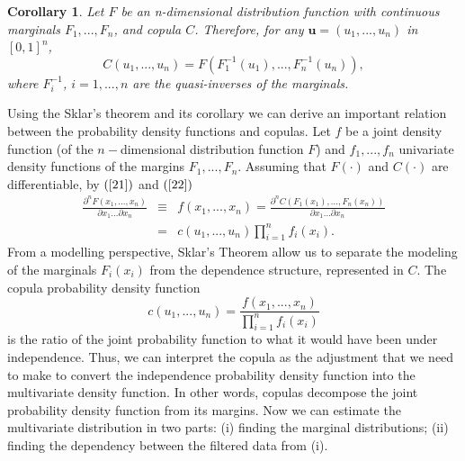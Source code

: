 \documentclass[a4paper,12pt]{report}
\newtheorem{corollary}{Corollary}[theorem]
\begin{document}
\bigskip

\begin{corollary}
	Let $F$ be an n-dimensional distribution function with continuous marginals $%
	F_{1},...,F_{n}$, and copula $C$. Therefore, for any $\mathbf{u}=\left(
	u_{1},...,u_{n}\right) $ in $\left[ 0,1\right] ^{n}$,
	\begin{equation}
	C\left( u_{1},...,u_{n}\right) =F\left( F_{1}^{-1}\left( u_{1}\right)
	,...,F_{n}^{-1}\left( u_{n}\right) \right) ,  \label{22}
	\end{equation}
	where $F_{i}^{-1}$, $i=1,...,n$ are the quasi-inverses of the marginals.
\end{corollary}

Using the Sklar's theorem and its corollary we can derive an important
relation between the probability density functions and copulas. Let $f$ be a
joint density function (of the $n-$dimensional distribution function $F$)
and $f_{1},...,f_{n}$ univariate density functions of the margins $%
F_{1},...,F_{n}$. Assuming that $F\left( \cdot \right) $ and $C\left( \cdot
\right) $ are differentiable, by $\left( \ref{21}\right) $ and $\left( \ref%
{22}\right) $
\begin{eqnarray}
\frac{\partial ^{n}F\left( x_{1},...,x_{n}\right) }{\partial
	x_{1}...\partial x_{n}} &\equiv &f\left( x_{1},...,x_{n}\right) =\frac{
	\partial ^{n}C\left( F_{1}\left( x_{1}\right) ,...,F_{n}\left( x_{n}\right)
	\right) }{\partial x_{1}...\partial x_{n}} \\
&=&c\left( u_{1},...,u_{n}\right) \prod_{i=1}^{n}f_{i}\left( x_{i}\right) .
\label{23}
\end{eqnarray}%
From a modelling perspective, Sklar's Theorem allow us to separate the
modeling of the marginals $F_{i}\left( x_{i}\right) $ from the dependence
structure, represented in $C$. The copula probability density function
\begin{equation}
c\left( u_{1},...,u_{n}\right) =\frac{f\left( x_{1},...,x_{n}\right) }{
	\prod_{i=1}^{n}f_{i}\left( x_{i}\right) }  \label{24}
\end{equation}%
is the ratio of the joint probability function to what it would have been
under independence. Thus, we can interpret the copula as the adjustment that
we need to make to convert the independence probability density function
into the multivariate density function. In other words, copulas decompose
the joint probability density function from its margins. Now we can estimate
the multivariate distribution in two parts: (i) finding the marginal
distributions; (ii) finding the dependency between the filtered data from
(i). 
\end{document}
